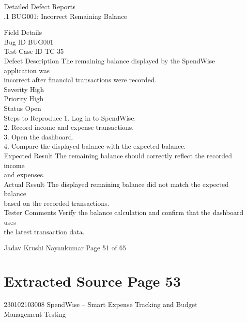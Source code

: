 \documentclass[12pt,a4paper]{report}
\begin{document}
\smallskip

 Detailed Defect Reports\\ 

.1 BUG001: Incorrect Remaining Balance\\ 

\smallskip

\smallskip
Field                 Details\\ 
Bug ID                BUG001\\ 
Test Case ID          TC-35\\ 
Defect Description    The remaining balance displayed by the SpendWise application was\\ 
incorrect after financial transactions were recorded.\\ 
Severity              High\\ 
Priority              High\\ 
Status                Open\\ 
Steps to Reproduce    1. Log in to SpendWise.\\ 
2. Record income and expense transactions.\\ 
3. Open the dashboard.\\ 
4. Compare the displayed balance with the expected balance.\\ 
Expected Result       The remaining balance should correctly reflect the recorded income\\ 
and expenses.\\ 
Actual Result         The displayed remaining balance did not match the expected balance\\ 
based on the recorded transactions.\\ 
Tester Comments       Verify the balance calculation and confirm that the dashboard uses\\ 
the latest transaction data.\\ 

\smallskip

\smallskip

\smallskip
Jadav Krushi Nayankumar                                                         Page 51 of 65\\ 

\clearpage
\section*{Extracted Source Page 53}
230102103008                           SpendWise – Smart Expense Tracking and Budget\\ 
Management Testing\\ 
\end{document}
